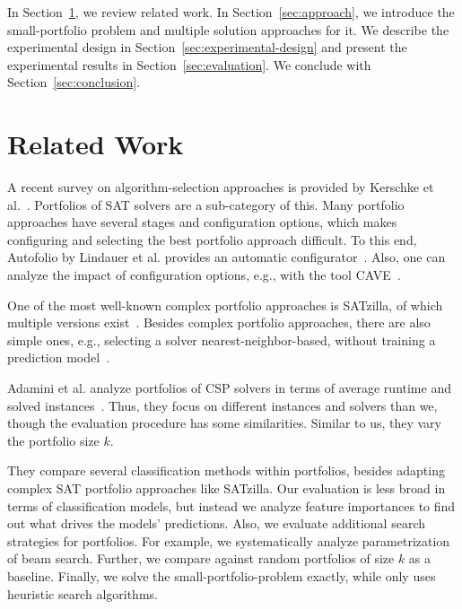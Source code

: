 \documentclass[conference]{IEEEtran}
\begin{document}
In Section~\ref{sec:related-work}, we review related work. 
In Section~\ref{sec:approach}, we introduce the small-portfolio problem and multiple solution approaches for it. 
We describe the experimental design in Section~\ref{sec:experimental-design} and present the experimental results in Section~\ref{sec:evaluation}. 
We conclude with Section~\ref{sec:conclusion}. 

\section{Related Work}
\label{sec:related-work}


A recent survey on algorithm-selection approaches is provided by Kerschke et al.~\cite{kerschke2019automated}.
Portfolios of SAT solvers are a sub-category of this. 
Many portfolio approaches have several stages and configuration options, which makes configuring and selecting the best portfolio approach difficult.
To this end, Autofolio by Lindauer et al. provides an automatic configurator~\cite{lindauer2015autofolio}.
Also, one can analyze the impact of configuration options, e.g., with the tool CAVE~\cite{biedenkapp2018cave}. 

One of the most well-known complex portfolio approaches is SATzilla, of which multiple versions exist~\cite{xu2008satzilla, xu2012satzilla2012}. 
Besides complex portfolio approaches, there are also simple ones, e.g., selecting a solver nearest-neighbor-based, without training a prediction model~\cite{malitsky2011non, nikolic2013simple, samulowitz2013snappy}.

Adamini et al. analyze portfolios of CSP solvers in terms of average runtime and solved instances~\cite{amadini2014empirical, amadini2016extensive}. 
Thus, they focus on different instances and solvers than we, though the evaluation procedure has some similarities.
Similar to us, they vary the portfolio size $k$.

They compare several classification methods within portfolios, besides adapting complex SAT portfolio approaches like SATzilla.
Our evaluation is less broad in terms of classification models, but instead we analyze feature importances to find out what drives the models' predictions.
Also, we evaluate additional search strategies for portfolios.
For example, we systematically analyze parametrization of beam search.
Further, we compare against random portfolios of size $k$ as a baseline.
Finally, we solve the small-portfolio-problem exactly, while \cite{amadini2014empirical} only uses heuristic search algorithms.
\end{document}
